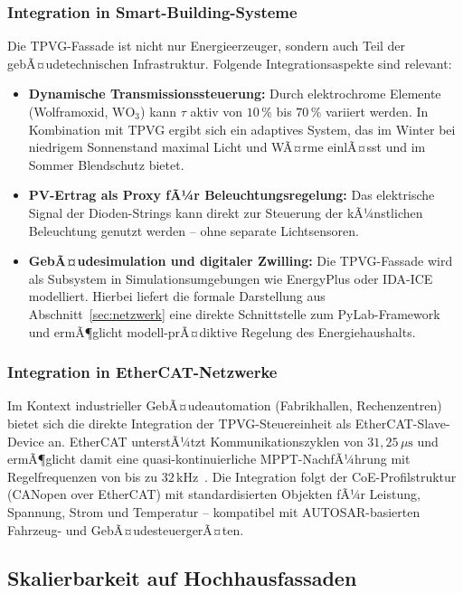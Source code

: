 ﻿\documentclass[a4paper,12pt]{article}
\theoremstyle{definition}
\theoremstyle{remark}
\begin{document}
\subsubsection{Integration in Smart-Building-Systeme}
Die TPVG-Fassade ist nicht nur Energieerzeuger, sondern auch Teil
der gebÃ¤udetechnischen Infrastruktur. Folgende Integrationsaspekte
sind relevant:
\begin{itemize}
  \item \textbf{Dynamische Transmissionssteuerung:} Durch
    elektrochrome Elemente (Wolframoxid, $\mathrm{WO_3}$) kann
    $\tau$ aktiv von $10\,\%$ bis $70\,\%$ variiert werden.
    In Kombination mit TPVG ergibt sich ein adaptives System, das
    im Winter bei niedrigem Sonnenstand maximal Licht und WÃ¤rme
    einlÃ¤sst und im Sommer Blendschutz bietet.
  \item \textbf{PV-Ertrag als Proxy fÃ¼r Beleuchtungsregelung:}
    Das elektrische Signal der Dioden-Strings kann direkt zur
    Steuerung der kÃ¼nstlichen Beleuchtung genutzt werden --
    ohne separate Lichtsensoren.
  \item \textbf{GebÃ¤udesimulation und digitaler Zwilling:}
    Die TPVG-Fassade wird als Subsystem in Simulationsumgebungen
    wie EnergyPlus oder IDA-ICE modelliert. Hierbei liefert die
    formale Darstellung aus Abschnitt~\ref{sec:netzwerk} eine
    direkte Schnittstelle zum PyLab-Framework~\cite{Epp2026PyLab}
    und ermÃ¶glicht modell-prÃ¤diktive Regelung des Energiehaushalts.
\end{itemize}

\subsubsection{Integration in EtherCAT-Netzwerke}
Im Kontext industrieller GebÃ¤udeautomation (Fabrikhallen, Rechenzentren)
bietet sich die direkte Integration der TPVG-Steuereinheit als
EtherCAT-Slave-Device an. EtherCAT unterstÃ¼tzt
Kommunikationszyklen von $31{,}25\,\mu\mathrm{s}$ und ermÃ¶glicht
damit eine quasi-kontinuierliche MPPT-NachfÃ¼hrung mit
Regelfrequenzen von bis zu $32\,\mathrm{kHz}$~\cite{Beckhoff2023}.
Die Integration folgt der CoE-Profilstruktur (CANopen over EtherCAT)
mit standardisierten Objekten fÃ¼r Leistung, Spannung, Strom
und Temperatur -- kompatibel mit AUTOSAR-basierten Fahrzeug- und
GebÃ¤udesteuergerÃ¤ten.

\subsection{Skalierbarkeit auf Hochhausfassaden}
\end{document}

